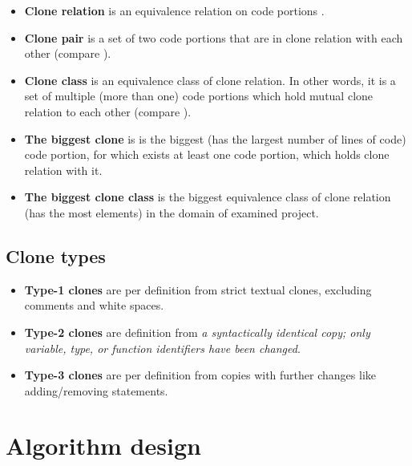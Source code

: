 \documentclass{uva-inf-article}
\begin{document}
\begin{itemize}

	\item{\textbf{Clone relation} is an equivalence relation on code portions \cite{kamiya2002ccfinder}.}
	
	\item{\textbf{Clone pair} is a set of two code portions that are in clone relation with each other (compare \cite{kamiya2002ccfinder}).}
	
	\item{\textbf{Clone class} is an equivalence class of clone relation. In other words, it is a set of multiple (more than one) code portions which hold mutual clone relation to each other (compare \cite{kamiya2002ccfinder}).}
	
	\item{\textbf{The biggest clone} is is the biggest (has the largest number of lines of code) code portion, for which exists at least one code portion, which holds clone relation with it.}
	
	\item{\textbf{The biggest clone class} is the biggest equivalence class of clone relation (has the most elements) in the domain of examined project.}
	
\end{itemize}	

\subsection{Clone types}

\begin{itemize}

	\item{\textbf{Type-1 clones}
are per definition from \cite{koschke2008identifying} strict textual clones, excluding comments and white spaces.}

	\item{\textbf{Type-2 clones}
are definition from \cite{koschke2008identifying}  \textit{a syntactically identical copy; only variable, type, or function identifiers have been changed}.}

	\item{\textbf{Type-3 clones}
are per definition from \cite{koschke2008identifying} copies with further changes like adding/removing statements.}

\end{itemize}

\section{Algorithm design}
\end{document}
